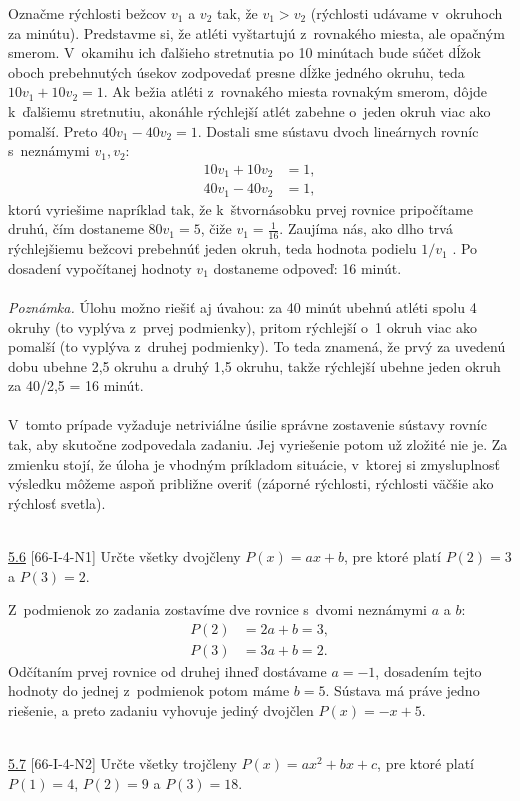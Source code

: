 \rieh Označme rýchlosti bežcov $v_1$ a $v_2$ tak, že $v_1 > v_2$ (rýchlosti udávame v~okruhoch za minútu). Predstavme si, že atléti vyštartujú z~rovnakého miesta, ale opačným smerom. V~okamihu ich ďalšieho stretnutia po 10 minútach bude súčet dĺžok oboch prebehnutých úsekov zodpovedať presne dĺžke jedného okruhu, teda
$10v_1 +10v_2= 1$.
Ak bežia atléti z~rovnakého miesta rovnakým smerom, dôjde k~ďalšiemu stretnutiu, akonáhle rýchlejší atlét zabehne o~jeden okruh viac ako pomalší. Preto $40v_1 -40v_2 = 1$.
Dostali sme sústavu dvoch lineárnych rovníc s~neznámymi $v_1 , v_2$:
\begin{align*}
10v_1 + 10v_2 &= 1,\\
40v_1 - 40v_2 &= 1,
\end{align*}
ktorú vyriešime napríklad tak, že k~štvornásobku prvej rovnice pripočítame druhú, čím dostaneme $80v_1 = 5$, čiže $v_1 =\frac{1}{16}$. Zaujíma nás, ako dlho trvá rýchlejšiemu bežcovi prebehnúť jeden okruh, teda hodnota podielu $1/v_1$ . Po dosadení vypočítanej hodnoty $v_1$ dostaneme odpoveď: 16 minút.\\
\\
\textit{Poznámka.} Úlohu možno riešiť aj úvahou: za 40 minút ubehnú atléti spolu 4 okruhy (to vyplýva z~prvej podmienky), pritom rýchlejší o~1 okruh viac ako pomalší (to vyplýva z~druhej podmienky). To teda znamená, že prvý za uvedenú dobu ubehne 2,5 okruhu a druhý 1,5 okruhu, takže rýchlejší ubehne jeden okruh za 40/2,5 = 16 minút.\\
\\
\kom V~tomto prípade vyžaduje netriviálne úsilie správne zostavenie sústavy rovníc tak, aby skutočne zodpovedala zadaniu. Jej vyriešenie potom už zložité nie je. Za zmienku stojí, že úloha je vhodným príkladom situácie, v~ktorej si zmysluplnosť výsledku môžeme aspoň približne overiť (záporné rýchlosti, rýchlosti väčšie ako rýchlosť svetla).\\
\\
\begin{tcolorbox}[breakable,notitle,boxrule=0pt,colback=light-gray,colframe=light-gray]\ul{5.6} [66-I-4-N1] Určte všetky dvojčleny $P (x) = ax + b$, pre ktoré platí $P(2) = 3$ a $P (3) = 2$.

\end{tcolorbox}

\rie Z~podmienok zo zadania zostavíme dve rovnice s~dvomi neznámymi $a$ a $b$:
\begin{align*}
P (2) &= 2a + b = 3,\\
P (3) &= 3a + b = 2.
\end{align*}
Odčítaním prvej rovnice od druhej ihneď dostávame $a = -1$, dosadením tejto hodnoty do jednej z~podmienok potom máme $b= 5$. Sústava má práve jedno riešenie, a preto zadaniu vyhovuje jediný dvojčlen $P(x)=-x+5$.\\
\\
\begin{tcolorbox}[breakable,notitle,boxrule=0pt,colback=light-gray,colframe=light-gray]\ul{5.7} [66-I-4-N2] Určte všetky trojčleny $P (x) = ax^2+ bx + c$, pre ktoré platí $P (1) = 4$, $P (2) = 9$ a $P (3) = 18$.

\end{tcolorbox}

